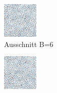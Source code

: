 \begin{figure}[H]

    \begin{subfigure}[b]{0.2\linewidth}
        \includegraphics[width=\linewidth]{content/TemporalerAlg/Bilder/Sorting/DiffDimensions/6/seed_debug_5.0_small_screen.png}
         \caption{Ausschnitt B=6}
         \label{pic:screen_B6}
    \end{subfigure}
    \begin{subfigure}[b]{0.2\linewidth}
        \includegraphics[width=\linewidth]{content/TemporalerAlg/Bilder/Sorting/DiffDimensions/7/seed_debug_5.0_small_screen.png}

\end{subfigure}
\end{figure}
